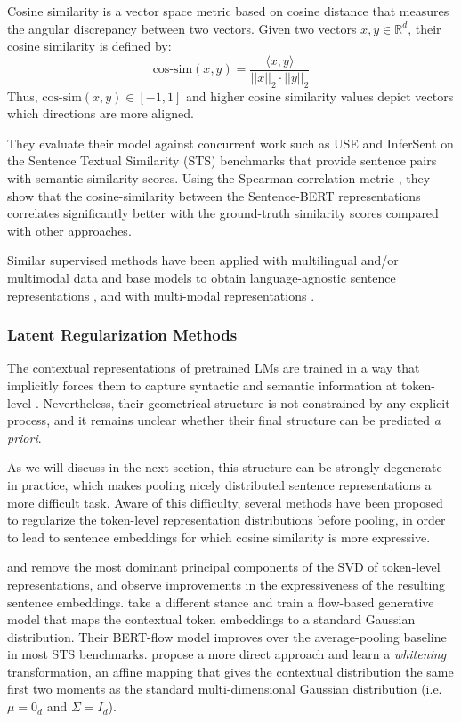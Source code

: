Cosine similarity is a vector space metric based on cosine distance that measures the angular discrepancy between two vectors. Given two vectors $x, y \in \mathbb{R}^d$, their cosine similarity is defined by:
$$
\text{cos-sim}(x, y) = \frac{\langle x, y \rangle}{||x||_2 \cdot ||y||_2}
$$
Thus, $\text{cos-sim}(x, y) \in [-1, 1]$ and higher cosine similarity values depict vectors which directions are more aligned.

They evaluate their model against concurrent work such as USE \citep{cer-etal-2018-universal} and InferSent \citep{conneau-etal-2017-supervised} on the Sentence Textual Similarity (STS) benchmarks that provide sentence pairs with semantic similarity scores. Using the Spearman correlation metric \citep{zar2005spearman}, they show that the cosine-similarity between the Sentence-BERT representations correlates significantly better with the ground-truth similarity scores compared with other approaches.

Similar supervised methods have been applied with multilingual and/or multimodal data and base models to obtain language-agnostic sentence representations \citep{feng-etal-2022-language}, and with multi-modal representations \citep{Duquenne:2023:sonar_arxiv}.


\subsubsection{Latent Regularization Methods}

The contextual representations of pretrained LMs are trained in a way that implicitly forces them to capture syntactic and semantic information at token-level \citep{jawahar-etal-2019-bert}. Nevertheless, their geometrical structure is not constrained by any explicit process, and it remains unclear whether their final structure can be predicted \textit{a priori}.

As we will discuss in the next section, this structure can be strongly degenerate in practice, which makes pooling nicely distributed sentence representations a more difficult task. Aware of this difficulty, several methods have been proposed to regularize the token-level representation distributions before pooling, in order to lead to sentence embeddings for which cosine similarity is more expressive.

\citet{arora2017a} and \citet{mu2018allbutthetop} remove the most dominant principal components of the SVD of token-level representations, and observe improvements in the expressiveness of the resulting sentence embeddings. \citet{li-etal-2020-sentence} take a different stance and train a flow-based generative model that maps the contextual token embeddings to a standard Gaussian distribution. Their BERT-flow model improves over the average-pooling baseline in most STS benchmarks. \citet{su2021whiteningsentencerepresentationsbetter} propose a more direct approach and learn a \textit{whitening} transformation, an affine mapping that gives the contextual distribution the same first two moments as the standard multi-dimensional Gaussian distribution (i.e. $\mu = 0_d$ and $\Sigma = I_d$).

